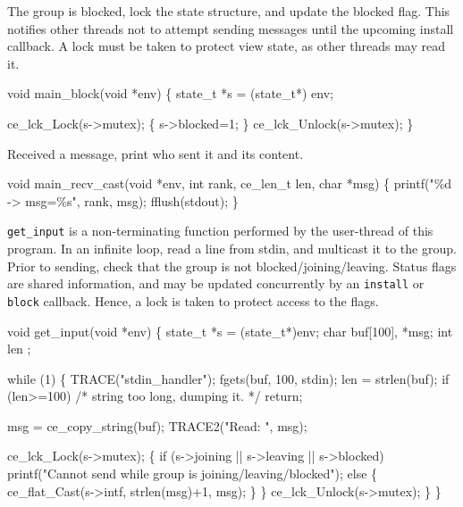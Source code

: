 The group is blocked, lock the state structure, and update the blocked
flag. This notifies other threads not to attempt sending messages
until the upcoming install callback. A lock must be taken to protect view
state, as other threads may read it.
\begin{codebox}
void
main_block(void *env)
\{
    state_t *s = (state_t*) env;
    
    ce_lck_Lock(s->mutex); \{
        s->blocked=1;
   \} ce_lck_Unlock(s->mutex);
\}
\end{codebox}

Received a message, print who sent it and its content.
\begin{codebox}
void
main_recv_cast(void *env, int rank, ce_len_t len, char *msg)
\{
    printf("\%d -> msg=\%s", rank, msg); fflush(stdout);
\}
\end{codebox}

{\tt get\_input} is a non-terminating function performed by the user-thread of
this program. In an infinite loop, read a line from stdin, 
and multicast it to the group. Prior to sending, check that the group is not
blocked/joining/leaving. Status flags are shared information, and
may be updated concurrently by an {\tt install} or {\tt block}
callback. Hence, a lock is taken to protect access to the flags.
\begin{codebox}
void
get_input(void *env)
\{
    state_t *s = (state_t*)env;
    char buf[100], *msg;
    int len ;

    while (1) \{
        TRACE("stdin_handler");
        fgets(buf, 100, stdin);
        len = strlen(buf);
        if (len>=100)
            /* string too long, dumping it.
             */
            return;
        	
        msg = ce_copy_string(buf);
        TRACE2("Read: ", msg);
	
        ce_lck_Lock(s->mutex); \{
            if (s->joining || s->leaving || s->blocked)
               	printf("Cannot send while group is joining/leaving/blocked");
            else \{
               	ce_flat_Cast(s->intf, strlen(msg)+1, msg);
            \}
        \} ce_lck_Unlock(s->mutex);
    \}
\}
\end{codebox}


